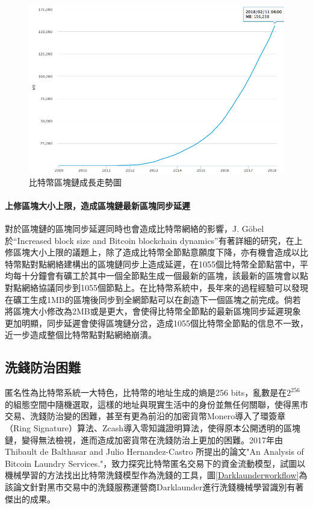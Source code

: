 			\begin{figure}[h]
				\centering
				\includegraphics[width = .7\textwidth]{blockchainsize.png}
				\caption{比特幣區塊鏈成長走勢圖\supercite{blockchainsize}}\label{blockchainsize}
			\end{figure}

			\paragraph{上修區塊大小上限，造成區塊鏈最新區塊同步延遲}
			對於區塊鏈的區塊同步延遲同時也會造成比特幣網絡的影響，J. Göbel於“Increased block size and Bitcoin blockchain dynamics”\supercite{TelecommunicationNetworksandApplicationsConferenceITNAC201727thInternational}有著詳細的研究，在上修區塊大小上限的議題上，除了造成比特幣全節點意願度下降，亦有機會造成以比特幣點對點網絡建構出的區塊鏈同步上造成延遲，在1055個比特幣全節點當中，平均每十分鐘會有礦工於其中一個全節點生成一個最新的區塊，該最新的區塊會以點對點網絡協議同步到1055個節點上。在比特幣系統中，長年來的過程經驗可以發現在礦工生成1MB的區塊後同步到全網節點可以在創造下一個區塊之前完成。倘若將區塊大小修改為2MB或是更大，會使得比特幣全節點的最新區塊同步延遲現象更加明顯，同步延遲會使得區塊鏈分岔，造成1055個比特幣全節點的信息不一致，近一步造成整個比特幣點對點網絡崩潰。

		\subsection{洗錢防治困難}
		匿名性為比特幣系統一大特色，比特幣的地址生成的熵是256 bits，亂數是在$2^{256}$的組態空間中隨機選取，這樣的地址與現實生活中的身份並無任何關聯，使得黑市交易、洗錢防治變的困難，甚至有更為前沿的加密貨幣Monero\supercite{noether2014monero}導入了環簽章（Ring Signature）\supercite{Thresholdringsignaturesandapplicationstoad-hocgroups}算法、Zcash\supercite{zhong2002faster}導入零知識證明算法\supercite{Zero-KnowledgeProofsofIdentity}，使得原本公開透明的區塊鏈，變得無法檢視，進而造成加密貨幣在洗錢防治上更加的困難。2017年由Thibault de Balthasar and Julio Hernandez-Castro 所提出的論文"An Analysis of Bitcoin Laundry Services."\supercite{AnAnalysisofBitcoinLaundryServices}，致⼒探究⽐特幣匿名交易下的資⾦流動模型，試圖以機械學習的方法找出比特幣洗錢模型作為洗錢的工具，圖\ref{Darklaunderworkflow}為該論文針對黑市交易中的洗錢服務運營商Darklaunder進行洗錢機械學習識別有著傑出的成果。

